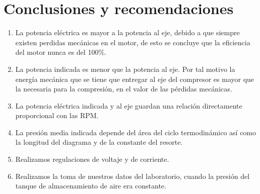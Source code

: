 \documentclass[a4paper,12pt]{report}
\begin{document}
\chapter{Conclusiones y recomendaciones}
\begin{enumerate}
\item La potencia eléctrica es mayor a la potencia al eje, debido a que siempre existen perdidas mecánicas en el motor, de esto se concluye que la eficiencia del  motor nunca es del 100\%.
\item La potencia indicada es menor que la potencia al eje. Por tal motivo la energía mecánica que se tiene que entregar al eje del compresor es mayor que la necesaria para la compresión, en el valor de las pérdidas mecánicas.
\item La potencia eléctrica indicada y al eje guardan una relación directamente proporcional con las RPM.
\item La presión media indicada depende del área del ciclo termodinámico así como la longitud del diagrama y de la constante del resorte.
\item Realizamos regulaciones de voltaje y de corriente.
\item Realizamos la toma de  nuestros datos del laboratorio, cuando la presión del tanque de almacenamiento de aire era constante.
\end{enumerate}
\end{document}
